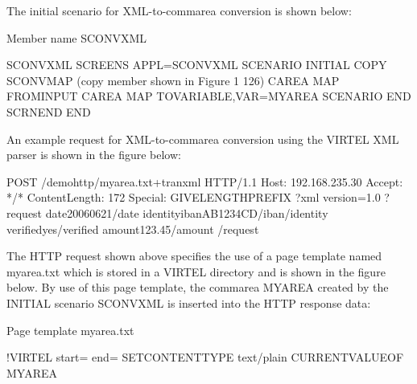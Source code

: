 \documentclass[letterpaper,10pt,english]{sphinxmanual}
\begin{document}

The initial scenario for XML-to-commarea conversion is shown below:
\label{\detokenize{User_Guide:v457ug-sconvxml}}
\def\sphinxLiteralBlockLabel{\label{\detokenize{User_Guide:v457ug-sconvxml}}}
\begin{sphinxVerbatim}[commandchars=\\\{\}]
Member name SCONVXML

SCONVXML    SCREENS APPL=SCONVXML
SCENARIO    INITIAL
            COPY SCONVMAP (copy member shown in Figure 1 \PYGZhy{}126)
CAREA       MAP\PYGZdl{} FROM\PYGZhy{}INPUT
CAREA       MAP\PYGZdl{} TO\PYGZhy{}VARIABLE,VAR=\PYGZsq{}MYAREA\PYGZsq{}
            SCENARIO END
            SCRNEND
END
\end{sphinxVerbatim}
\let\sphinxLiteralBlockLabel\empty


An example request for XML-to-commarea conversion using the VIRTEL XML parser is shown in the figure below:

\begin{sphinxVerbatim}[commandchars=\\\{\}]
POST /demohttp/myarea.txt+tranxml HTTP/1.1
Host: 192.168.235.30
Accept: */*
Content\PYGZhy{}Length: 172
Special: GIVE\PYGZhy{}LENGTH\PYGZhy{}PREFIX
\PYGZlt{}?xml version=\PYGZdq{}1.0\PYGZdq{} ?\PYGZgt{}
\PYGZlt{}request\PYGZgt{}
    \PYGZlt{}date\PYGZgt{}2006\PYGZhy{}06\PYGZhy{}21\PYGZlt{}/date\PYGZgt{}
    \PYGZlt{}identity\PYGZgt{}\PYGZlt{}iban\PYGZgt{}AB1234CD\PYGZlt{}/iban\PYGZgt{}\PYGZlt{}/identity\PYGZgt{}
    \PYGZlt{}verified\PYGZgt{}yes\PYGZlt{}/verified\PYGZgt{}
    \PYGZlt{}amount\PYGZgt{}\PYGZdl{}123.45\PYGZlt{}/amount\PYGZgt{}
\PYGZlt{}/request\PYGZgt{}
\end{sphinxVerbatim}


The HTTP request shown above specifies the use of a page template named myarea.txt which is stored in a VIRTEL
directory and is shown in the figure below. By use of this page template, the commarea MYAREA created by the
INITIAL scenario SCONVXML is inserted into the HTTP response data:

\begin{sphinxVerbatim}[commandchars=\\\{\}]
Page template myarea.txt

\PYGZlt{}!\PYGZhy{}\PYGZhy{}VIRTEL start=\PYGZdq{}\PYGZob{}\PYGZob{}\PYGZob{}\PYGZdq{} end=\PYGZdq{}\PYGZcb{}\PYGZcb{}\PYGZcb{}\PYGZdq{} \PYGZhy{}\PYGZhy{}\PYGZgt{}
\PYGZob{}\PYGZob{}\PYGZob{} SET\PYGZhy{}CONTENT\PYGZhy{}TYPE \PYGZdq{}text/plain\PYGZdq{}\PYGZcb{}\PYGZcb{}\PYGZcb{}
\PYGZob{}\PYGZob{}\PYGZob{} CURRENT\PYGZhy{}VALUE\PYGZhy{}OF \PYGZdq{}MYAREA\PYGZdq{} \PYGZcb{}\PYGZcb{}\PYGZcb{}
\end{sphinxVerbatim}
\end{document}

